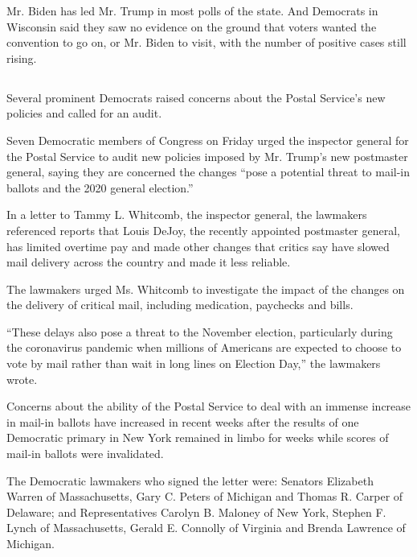 Mr. Biden has led Mr. Trump in most polls of the state. And Democrats in
Wisconsin said they saw no evidence on the ground that voters wanted the
convention to go on, or Mr. Biden to visit, with the number of positive
cases still rising.

\hypertarget{-4}{%
\subsection{}\label{-4}}

Several prominent Democrats raised concerns about the Postal Service's
new policies and called for an audit.

Seven Democratic members of Congress on Friday urged the inspector
general for the Postal Service to audit new policies imposed by Mr.
Trump's new postmaster general, saying they are concerned the changes
``pose a potential threat to mail-in ballots and the 2020 general
election.''

In a letter to Tammy L. Whitcomb, the inspector general, the lawmakers
referenced reports that Louis DeJoy, the recently appointed postmaster
general, has limited overtime pay and made other changes that critics
say have slowed mail delivery across the country and made it less
reliable.

The lawmakers urged Ms. Whitcomb to investigate the impact of the
changes on the delivery of critical mail, including medication,
paychecks and bills.

``These delays also pose a threat to the November election, particularly
during the coronavirus pandemic when millions of Americans are expected
to choose to vote by mail rather than wait in long lines on Election
Day,'' the lawmakers wrote.

Concerns about the ability of the Postal Service to deal with an immense
increase in mail-in ballots have increased in recent weeks after the
results of one Democratic primary in New York remained in limbo for
weeks while scores of mail-in ballots were invalidated.

The Democratic lawmakers who signed the letter were: Senators Elizabeth
Warren of Massachusetts, Gary C. Peters of Michigan and Thomas R. Carper
of Delaware; and Representatives Carolyn B. Maloney of New York, Stephen
F. Lynch of Massachusetts, Gerald E. Connolly of Virginia and Brenda
Lawrence of Michigan.

\hypertarget{-5}{%
\subsection{}\label{-5}}


